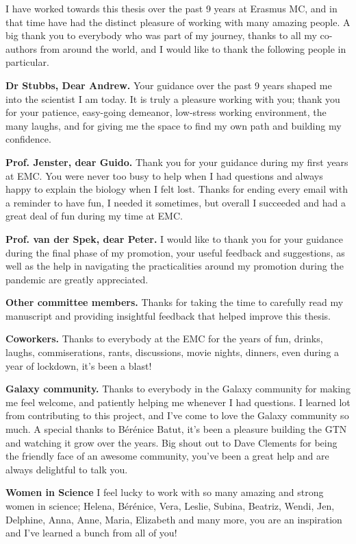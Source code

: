 
 I have worked towards this thesis over the past 9 years at Erasmus MC, and in that time have had the distinct pleasure of working with many amazing people. A big thank you to everybody who was part of my journey, thanks to all my co-authors from around the world, and I would like to thank the following people in particular.

\textbf{Dr Stubbs, Dear Andrew.} Your guidance over the past 9 years shaped me into the scientist I am today. It is truly a pleasure working with you; thank you for your patience, easy-going demeanor, low-stress working environment, the many laughs, and for giving me the space to find my own path and building my confidence.

\textbf{Prof. Jenster, dear Guido.} Thank you for your guidance during my first years at EMC. You were never too busy to help when I had questions and always happy to explain the biology when I felt lost. Thanks for ending every email with a reminder to have fun, I needed it sometimes, but overall I succeeded and had a great deal of fun during my time at EMC.

\textbf{Prof. van der Spek, dear Peter.} I would like to thank you for your guidance during the final phase of my promotion, your useful feedback and suggestions, as well as the help in navigating the practicalities around my promotion during the pandemic are greatly appreciated.

\textbf{Other committee members.} Thanks for taking the time to carefully read my manuscript and providing insightful feedback that helped improve this thesis.

\textbf{Coworkers.} Thanks to everybody at the EMC for the years of fun, drinks, laughs, commiserations, rants, discussions, movie nights, dinners, even during a year of lockdown, it's been a blast!

\textbf{Galaxy community.} Thanks to everybody in the Galaxy community for making me feel welcome, and patiently helping me whenever I had questions. I learned lot from contributing to this project, and I've come to love the Galaxy community so much. A special thanks to Bérénice Batut, it's been a pleasure building the GTN and watching it grow over the years. Big shout out to Dave Clements for being the friendly face of an awesome community, you've been a great help and are always delightful to talk you.

\textbf{Women in Science} I feel lucky to work with so many amazing and strong women in science; Helena, Bérénice, Vera, Leslie, Subina, Beatriz, Wendi, Jen, Delphine, Anna, Anne, Maria, Elizabeth and many more, you are an inspiration and I've learned a bunch from all of you!

